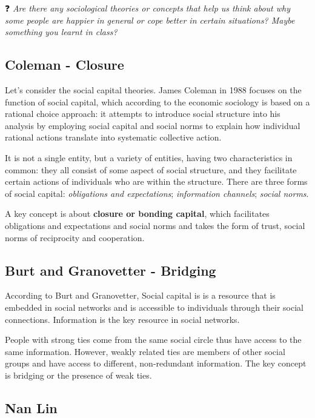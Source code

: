 \documentclass[
  notitlepage,
  onecolumn,
  openany]{book}
\begin{document}
❓ \emph{Are there any sociological theories or concepts that help us think about why some people are happier in general or cope better in certain situations? Maybe something you learnt in class?}

\hypertarget{coleman---closure}{%
\subsection{Coleman - Closure}\label{coleman---closure}}

Let's consider the social capital theories. James Coleman in 1988 focuses on the function of social capital, which according to the economic sociology is based on a rational choice approach: it attempts to introduce social structure into his analysis by employing social capital and social norms to explain how individual rational actions translate into systematic collective action.

It is not a single entity, but a variety of entities, having two characteristics in common: they all consist of some aspect of social structure, and they facilitate certain actions of individuals who are within the structure. There are three forms of social capital: \emph{obligations and expectations}; \emph{information channels}; \emph{social norms}.

A key concept is about \textbf{closure or bonding capital}, which facilitates obligations and expectations and social norms and takes the form of trust, social norms of reciprocity and cooperation.

\hypertarget{burt-and-granovetter---bridging}{%
\subsection{Burt and Granovetter - Bridging}\label{burt-and-granovetter---bridging}}

According to Burt and Granovetter, Social capital is is a resource that is embedded in social networks and is accessible to individuals through their social connections. Information is the key resource in social networks.

People with strong ties come from the same social circle thus have access to the same information. However, weakly related ties are members of other social groups and have access to different, non-redundant information. The key concept is bridging or the presence of weak ties.

\hypertarget{nan-lin}{%
\subsection{Nan Lin}\label{nan-lin}}
\end{document}
